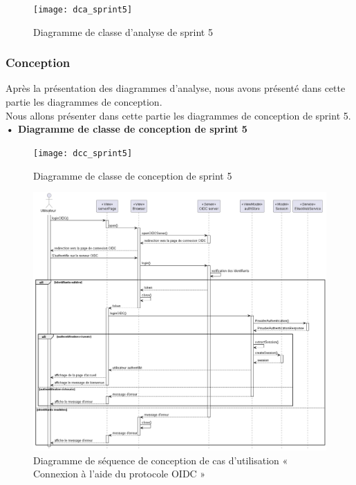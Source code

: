 \begin{figure}[H]
  \centering
  \texttt{[image: dca\_sprint5]}
  \caption{Diagramme de classe d'analyse de sprint 5}
  \label{fig:class_analyse_sprint5}
\end{figure}


\subsubsection{Conception}

Après la présentation des diagrammes d'analyse, nous avons présenté dans cette partie les diagrammes de conception.\\ 
Nous allons présenter dans cette partie les diagrammes de conception de sprint 5. \\
\textbf{•	Diagramme de classe de conception de sprint 5}

\begin{figure}[H]
  \centering
  \texttt{[image: dcc\_sprint5]}
  \caption{Diagramme de classe de conception de sprint 5}
  \label{fig:class_diagram_51}
\end{figure}


\begin{figure}[H]
  \centering
  \includegraphics[width=1\textwidth]{out/diagrams/sprint5/sequence_OIDC/sequence_OIDC}
  \caption{Diagramme de séquence de conception de cas d'utilisation « Connexion à l'aide du protocole OIDC »}
  \label{fig:sequence_conception_auth_OIDC}
\end{figure}

